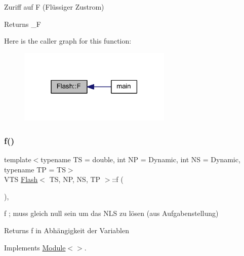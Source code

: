 Zuriff auf F (Flüssiger Zustrom) 

\begin{DoxyReturn}{Returns}
\+\_\+F 
\end{DoxyReturn}
Here is the caller graph for this function\+:
\nopagebreak
\begin{figure}[H]
\begin{center}
\leavevmode
\includegraphics[width=207pt]{class_flash_ac44eff7052e26a0075c21b4f068e162e_icgraph}
\end{center}
\end{figure}
\mbox{\label{class_flash_ad29e755877ca96aa5b9f34a10d6cd8b2}} 
\subsubsection{\texorpdfstring{f()}{f()}}
{\footnotesize\ttfamily template$<$typename TS = double, int NP = Dynamic, int NS = Dynamic, typename TP = TS$>$ \\
V\+TS \mbox{\hyperlink{class_flash}{Flash}}$<$ TS, NP, NS, TP $>$\+::f (\begin{DoxyParamCaption}{ }\end{DoxyParamCaption})\hspace{0.3cm}{\ttfamily [inline]}, {\ttfamily [virtual]}}



f ; muss gleich null sein um das N\+LS zu lösen (aus Aufgabenstellung) 

\begin{DoxyReturn}{Returns}
f in Abhängigkeit der Variablen 
\end{DoxyReturn}


Implements \mbox{\hyperlink{class_module_a2499211a4fc52bc33512761ea7fb3c62}{Module$<$$>$}}.

